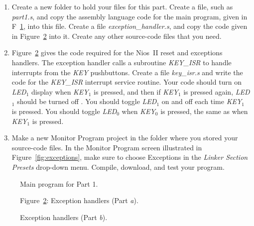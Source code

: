 \documentclass[epsfig,10pt,fullpage]{article}
\begin{document}
\begin{enumerate}
\item Create a new folder to hold your files for this part. Create a
file, such as {\it part1.s}, and copy the assembly language code for the main program,
given in F~\ref{fig:code}, into this file. Create a file {\it exception\_handler.s},
and copy the code given in Figure~\ref{fig:handlers} into it.
Create any other source-code files that you need.

\item 
Figure~\ref{fig:handlers} gives the code required for the Nios~II reset and 
exceptions handlers. The exception handler calls a subroutine {\it KEY\_ISR} to handle interrupts from the {\it KEY} pushbuttons.
Create a file {\it key\_isr.s} and write the code for the {\it KEY\_ISR} interrupt service routine.
Your code should turn on {\it LED}$_1$ display when {\it KEY}$_1$ is
pressed, and then if {\it KEY}$_1$ is pressed again, {\it LED}$_1$ should be turned off . You should
toggle {\it LED}$_1$ on and off each time {\it KEY}$_1$ is pressed. You should toggle {\it LED}$_0$ when {\it KEY}$_0$ is pressed, the same as when {\it KEY}$_1$ is pressed. 

\item
Make a new Monitor Program project in the folder where you stored your source-code files.
In the Monitor Program screen illustrated in Figure~\ref{fig:exceptions}, make sure 
to choose {\sf Exceptions} in the {\it Linker Section Presets} drop-down menu.
Compile, download, and test your program. 
\end{enumerate}

\begin{figure}[H]
\begin{center}

\end{center}
\caption{Main program for Part 1.}
\label{fig:code}
\end{figure}

\begin{figure}[H]
\begin{center}

Figure~\ref{fig:handlers}: Exception handlers (Part \textit{a}).
\end{center}
\end{figure}

\begin{figure}[H]
\begin{center}

\end{center}
\caption{Exception handlers (Part \textit{b}).}
\label{fig:handlers}
\end{figure}
\end{document}
